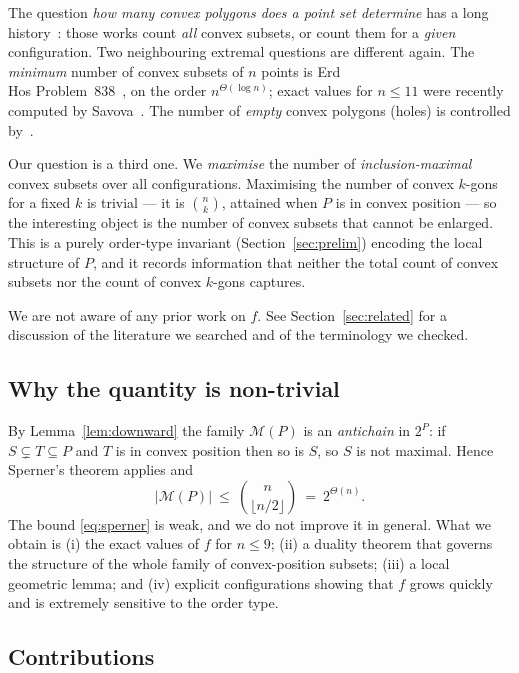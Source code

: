 \documentclass[11pt,a4paper]{article}
\theoremstyle{definition}
\newcommand{\M}{\mathcal{M}}
\begin{document}
The question \emph{how many convex polygons does a point set determine} has a long
history~\cite{rote91,rote92,mitchell95,huemer2022}: those works count \emph{all}
convex subsets, or count them for a \emph{given} configuration.  Two neighbouring
extremal questions are different again.  The \emph{minimum} number of convex
subsets of $n$ points is Erd{\\H{o}}s Problem~838~\cite{erdos838}, on the order
$n^{\Theta(\log n)}$; exact values for $n\le 11$ were recently computed
by Savova~\cite{savova2026}.  The number of \emph{empty} convex polygons (holes)
is controlled by~\cite{baranyvaltr04,pinchasi2006,bae2022,suk2017}.

Our question is a third one.  We \emph{maximise} the number of
\emph{inclusion-maximal} convex subsets over all configurations.  Maximising the
number of convex $k$-gons for a fixed $k$ is trivial --- it is $\binom{n}{k}$,
attained when $P$ is in convex position --- so the interesting object is the
number of convex subsets that cannot be enlarged.  This is a purely order-type
invariant (Section~\ref{sec:prelim}) encoding the local structure of $P$, and it
records information that neither the total count of convex subsets nor the count
of convex $k$-gons captures.

We are not aware of any prior work on $f$.  See Section~\ref{sec:related} for a
discussion of the literature we searched and of the terminology we checked.

\subsection{Why the quantity is non-trivial}

By Lemma~\ref{lem:downward} the family $\M(P)$ is an \emph{antichain} in $2^P$: if
$S\subsetneq T\subseteq P$ and $T$ is in convex position then so is $S$, so $S$
is not maximal.  Hence Sperner's theorem applies and
\begin{equation}
  |\M(P)|\ \le\ \binom{n}{\lfloor n/2\rfloor}\ =\ 2^{\Theta(n)} .
  \label{eq:sperner}
\end{equation}
The bound \eqref{eq:sperner} is weak, and we do not improve it in general.  What
we obtain is (i) the exact values of $f$ for $n\le 9$; (ii) a duality theorem that
governs the structure of the whole family of convex-position subsets; (iii) a
local geometric lemma; and (iv) explicit configurations showing that $f$ grows
quickly and is extremely sensitive to the order type.

\subsection{Contributions}
\end{document}
